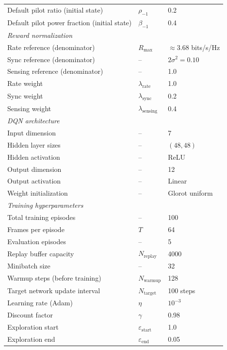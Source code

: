 \begin{table}[!h]
\begin{tabular}{lll}
        Default pilot ratio (initial state) & $\rho_{-1}$ & 0.2 \\
        Default pilot power fraction (initial state) & $\beta_{-1}$ & 0.4 \\[4pt]
        \multicolumn{3}{l}{\textit{Reward normalization}} \\
        Rate reference (denominator) & $R_{\max}$ & $\approx 3.68$ bits/s/Hz \\
        Sync reference (denominator) & -- & $2\sigma^2 = 0.10$ \\
        Sensing reference (denominator) & -- & 1.0 \\
        Rate weight & $\lambda_{\text{rate}}$ & 1.0 \\
        Sync weight & $\lambda_{\text{sync}}$ & 0.2 \\
        Sensing weight & $\lambda_{\text{sensing}}$ & 0.4 \\[4pt]
        \multicolumn{3}{l}{\textit{DQN architecture}} \\
        Input dimension & -- & 7 \\
        Hidden layer sizes & -- & $(48, 48)$ \\
        Hidden activation & -- & ReLU \\
        Output dimension & -- & 12 \\
        Output activation & -- & Linear \\
        Weight initialization & -- & Glorot uniform \\[4pt]
        \multicolumn{3}{l}{\textit{Training hyperparameters}} \\
        Total training episodes & -- & 100 \\
        Frames per episode & $T$ & 64 \\
        Evaluation episodes & -- & 5 \\
        Replay buffer capacity & $N_{\text{replay}}$ & 4000 \\
        Minibatch size & -- & 32 \\
        Warmup steps (before training) & $N_{\text{warmup}}$ & 128 \\
        Target network update interval & $N_{\text{target}}$ & 100 steps \\
        Learning rate (Adam) & $\eta$ & $10^{-3}$ \\
        Discount factor & $\gamma$ & 0.98 \\
        Exploration start & $\varepsilon_{\text{start}}$ & 1.0 \\
        Exploration end & $\varepsilon_{\text{end}}$ & 0.05 \\

\end{tabular}
\end{table}
